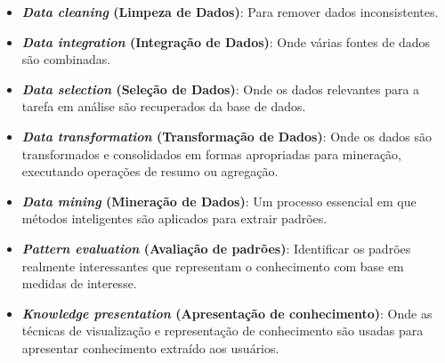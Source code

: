 \begin{itemize}
    \item \textbf{\textit{Data cleaning} (Limpeza de Dados)}: Para remover dados inconsistentes.

    \item \textbf{\textit{Data integration} (Integração de Dados)}: Onde várias fontes de dados são combinadas.

    \item \textbf{\textit{Data selection} (Seleção de Dados)}: Onde os dados relevantes para a tarefa em análise são recuperados da base de dados.

    \item \textbf{\textit{Data transformation} (Transformação de Dados)}: Onde os dados são transformados e consolidados em formas apropriadas para mineração, executando operações de resumo ou agregação.

    \item \textbf{\textit{Data mining} (Mineração de Dados)}: Um processo essencial em que métodos inteligentes são aplicados para extrair padrões.
    \item \textbf{\textit{Pattern evaluation} (Avaliação de padrões)}: Identificar os padrões realmente interessantes que representam o conhecimento com base em medidas de interesse.

    \item \textbf{\textit{Knowledge presentation} (Apresentação de conhecimento)}: Onde as técnicas de visualização e representação de conhecimento são usadas para apresentar conhecimento extraído aos usuários.

\end{itemize}

